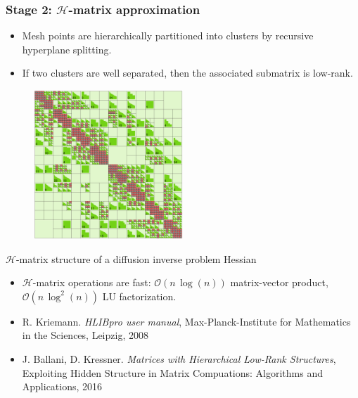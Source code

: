 \documentclass[10pt,final,xcolor=dvipsnames]{beamer}
\begin{document}
\begin{frame}
	\frametitle{Stage 2: $\mathcal{H}$-matrix approximation}
	
	\begin{minipage}{0.49\textwidth} 
		\begin{itemize}
			\item Mesh points are 
			hierarchically partitioned into
			clusters by recursive hyperplane splitting.
			\item If two clusters are well separated, then the associated
			submatrix is low-rank.
		\end{itemize}
	\end{minipage}
	\begin{minipage}{0.49\textwidth}
		\begin{figure}[htb]
			\centering\includegraphics[width=0.5\textwidth]
			{extraplots/heat_inverse_problem_Hfull_hmatrix.eps}
		\end{figure}
		\begin{center}
			{\tiny $\mathcal{H}$-matrix structure of a diffusion
				inverse problem Hessian \\}
		\end{center}
	\end{minipage}
	
	\begin{itemize}
		\item 
		$\mathcal{H}$-matrix operations are fast: $\mathcal{O}\left(n\,\log\left(n\right)\right)$
		matrix-vector product, $\mathcal{O}\left(n\,\log^{2}\left(n\right)\right)$
		LU factorization.
	\end{itemize}
	
	\scriptsize{
		\begin{itemize}
			\item[]  R. Kriemann.
			{\em HLIBpro user manual}, Max-Planck-Institute
			for Mathematics in the Sciences, Leipzig, 2008
			\item[]   J. Ballani, D. Kressner.
			{\em Matrices with Hierarchical Low-Rank Structures},
			Exploiting Hidden Structure in Matrix Compuations:
			Algorithms and Applications, 2016
		\end{itemize}
	}
	
\end{frame}
\end{document}

